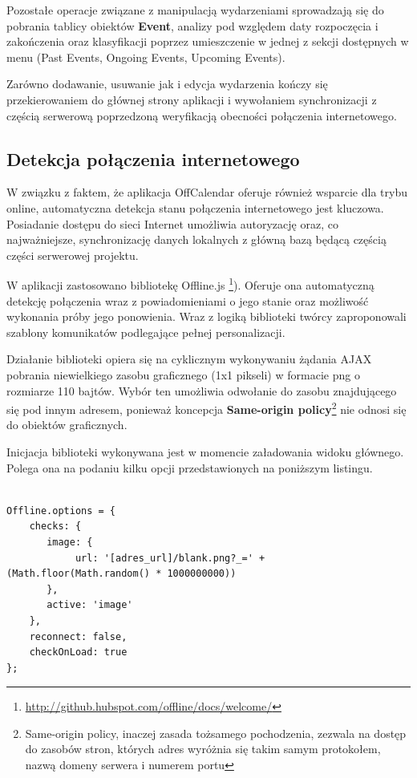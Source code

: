 Pozostałe operacje związane z manipulacją wydarzeniami sprowadzają się do pobrania tablicy obiektów \textbf{Event}, analizy pod względem daty rozpoczęcia i zakończenia oraz klasyfikacji poprzez umieszczenie w jednej z sekcji dostępnych w menu (Past Events, Ongoing Events, Upcoming Events).

Zarówno dodawanie, usuwanie jak i edycja wydarzenia kończy się przekierowaniem do głównej strony aplikacji i wywołaniem synchronizacji z częścią serwerową poprzedzoną weryfikacją obecności połączenia internetowego.

\subsection{Detekcja połączenia internetowego}
\label{sec:detPolInt}

W związku z faktem, że aplikacja OffCalendar oferuje również wsparcie dla trybu online, automatyczna detekcja stanu połączenia internetowego jest kluczowa. Posiadanie dostępu do sieci Internet umożliwia autoryzację oraz, co najważniejsze, synchronizację danych lokalnych z główną bazą będącą częścią części serwerowej projektu.

W aplikacji zastosowano bibliotekę Offline.js \footnote{\url{http://github.hubspot.com/offline/docs/welcome/}}). Oferuje ona automatyczną detekcję połączenia wraz z powiadomieniami o jego stanie oraz możliwość wykonania próby jego ponowienia. Wraz z logiką biblioteki twórcy zaproponowali szablony komunikatów podlegające pełnej personalizacji.

Działanie biblioteki opiera się na cyklicznym wykonywaniu żądania AJAX pobrania niewielkiego zasobu graficznego (1x1 pikseli) w formacie png o rozmiarze 110 bajtów. Wybór ten umożliwia odwołanie do zasobu znajdującego się pod innym adresem, ponieważ koncepcja \textbf{Same-origin policy}\footnote{Same-origin policy, inaczej zasada tożsamego pochodzenia, zezwala na dostęp do zasobów stron, których adres wyróżnia się takim samym protokołem, nazwą domeny serwera i numerem portu\cite{sameOrigin}} nie odnosi się do obiektów graficznych.

Inicjacja biblioteki wykonywana jest w momencie załadowania widoku głównego. Polega ona na podaniu kilku opcji przedstawionych na poniższym listingu.

\begin{lstlisting}[caption=Inicjalizacja biblioteki Offline.js badającej stan połączenia internetowego., label=amb, captionpos=b]

Offline.options = {
	checks: {
   	   image: {
            url: '[adres_url]/blank.png?_=' + (Math.floor(Math.random() * 1000000000))
       },
       active: 'image'
    },
    reconnect: false,
    checkOnLoad: true
};

\end{lstlisting}

